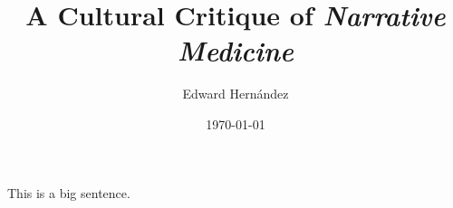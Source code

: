 \documentclass[12pt]{article}
\begin{document}
\title{A Cultural Critique of \emph{Narrative Medicine}}
\author{Edward Hern\'{a}ndez}
\date{\today}

\maketitle

\abstract{}

\vspace{12pt}

This is a big sentence.
\autocite{Charon06}
\autocite{Eiesland05}
\autocite{Eiesland94}
\autocite{Jones15a}
\autocite{Jones15b}
\autocite{Morris00}
\autocite{Reynolds08}
\autocite{Sullivan95}
\autocite{Yong11}

\clearpage
\printbibliography

\end{document}
